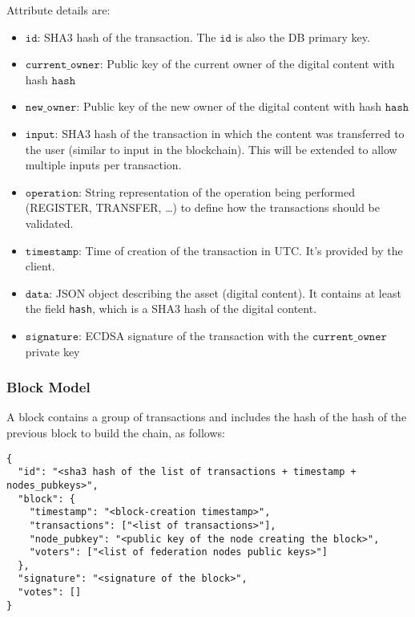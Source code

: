 Attribute details are:
\begin{itemize}
 \item $\mathtt{id}$: SHA3 hash of the transaction. The $\mathtt{id}$ is also the DB primary key.
 \item $\mathtt{current\_owner}$: Public key of the current owner of the digital content with hash $\mathtt{hash}$
 \item $\mathtt{new\_owner}$: Public key of the new owner of the digital content with hash $\mathtt{hash}$
 \item $\mathtt{input}$: SHA3 hash of the transaction in which the content was transferred to the user (similar to input in the blockchain). This will be extended to allow multiple inputs per transaction. 
 \item $\mathtt{operation}$: String representation of the operation being performed (REGISTER, TRANSFER, \ldots) to define how the transactions should be validated.
 \item $\mathtt{timestamp}$: Time of creation of the transaction in UTC. It's provided by the client.
 \item $\mathtt{data}$: JSON object describing the asset (digital content). It contains at least the field \texttt{hash}, which is a SHA3 hash of the digital content. 
 \item $\mathtt{signature}$: ECDSA signature of the transaction with the $\mathtt{current\_owner}$ private key
\end{itemize}

\subsubsection{Block Model}
A block contains a group of transactions and includes the hash of the hash of the previous block to build the chain, as follows:

\begin{lstlisting}[style=json]
{
  "id": "<sha3 hash of the list of transactions + timestamp + nodes_pubkeys>",
  "block": {
    "timestamp": "<block-creation timestamp>",
    "transactions": ["<list of transactions>"], 
    "node_pubkey": "<public key of the node creating the block>", 
    "voters": ["<list of federation nodes public keys>"]
  },
  "signature": "<signature of the block>",
  "votes": []
}
\end{lstlisting}

